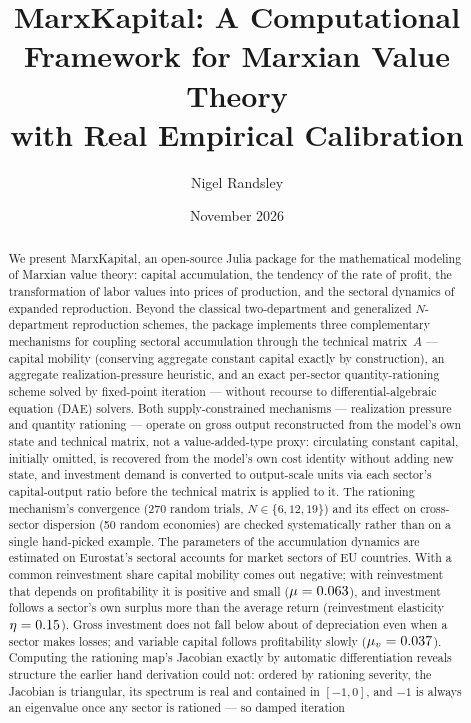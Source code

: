 \documentclass[11pt]{article}
\title{MarxKapital: A Computational Framework for Marxian Value Theory\\
with Real Empirical Calibration}
\author{Nigel Randsley}
\date{November 2026}
\begin{document}
\maketitle

\begin{abstract}
We present MarxKapital, an open-source Julia package for the mathematical
modeling of Marxian value theory: capital accumulation, the tendency of the
rate of profit, the transformation of labor values into prices of
production, and the sectoral dynamics of expanded reproduction. Beyond the
classical two-department and generalized $N$-department reproduction
schemes, the package implements three complementary mechanisms for coupling
sectoral accumulation through the technical matrix~$A$ --- capital
mobility (conserving aggregate constant capital exactly by construction),
an aggregate realization-pressure heuristic, and an exact per-sector
quantity-rationing scheme solved by fixed-point iteration --- without
recourse to differential-algebraic equation (DAE) solvers. Both
supply-constrained mechanisms --- realization pressure and quantity
rationing --- operate on gross output reconstructed from the model's own
state and technical matrix, not a value-added-type proxy: circulating
constant capital, initially omitted, is recovered from the model's own
cost identity without adding new state, and investment demand is
converted to output-scale units via each sector's capital-output ratio
before the technical matrix is applied to it. The rationing
mechanism's convergence (270 random trials, $N\in\{6,12,19\}$) and its
effect on cross-sector dispersion (50 random economies) are checked
systematically rather than on a single hand-picked example. The
parameters of the accumulation dynamics are estimated on Eurostat's
sectoral accounts for \EstSectors{} market sectors of \EstCountries{} EU
countries. With a common reinvestment share capital mobility comes out
negative; with reinvestment that depends on profitability it is positive
and small ($\mu=0.063$), and investment follows a sector's own surplus
more than the average return (reinvestment elasticity $\eta=0.15$).
Gross investment does not fall below about \EstFloor{} of
depreciation even when a sector makes losses; and variable capital
follows profitability slowly ($\mu_v=0.037$). Computing the rationing map's Jacobian
exactly by automatic differentiation reveals structure the earlier
hand derivation could not: ordered by rationing severity, the Jacobian is
triangular, its spectrum is real and contained in $[-1,0]$, and $-1$ is
always an eigenvalue once any sector is rationed --- so damped iteration

\end{abstract}
\end{document}
